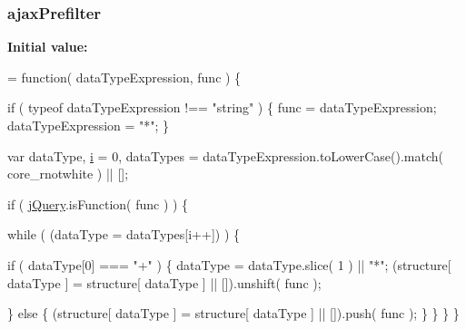 \subsubsection[{ajax\+Prefilter}]{ ajax\+Prefilter}\label{jquery-1_810_82-vsdoc_8js_a414ccda111294ca405827d1f416a7512}
{\bfseries Initial value\+:}
\begin{DoxyCode}
= \textcolor{keyword}{function}( dataTypeExpression, func ) \{



        \textcolor{keywordflow}{if} ( typeof dataTypeExpression !== \textcolor{stringliteral}{"string"} ) \{
            func = dataTypeExpression;
            dataTypeExpression = \textcolor{stringliteral}{"*"};
        \}

        var dataType,
            \hyperlink{_bibabook_2_scripts_2respond_8min_8js_a5e25b1d1bed9ab5f3174b76d6a722180}{i} = 0,
            dataTypes = dataTypeExpression.toLowerCase().match( core\_rnotwhite ) || [];

        \textcolor{keywordflow}{if} ( \hyperlink{jquery-1_810_82-vsdoc_8js_add5237586d970a38a81f990e8eb28c6c}{jQuery}.isFunction( func ) ) \{
            
            \textcolor{keywordflow}{while} ( (dataType = dataTypes[i++]) ) \{
                
                \textcolor{keywordflow}{if} ( dataType[0] === \textcolor{stringliteral}{"+"} ) \{
                    dataType = dataType.slice( 1 ) || \textcolor{stringliteral}{"*"};
                    (structure[ dataType ] = structure[ dataType ] || []).unshift( func );

                
                \} \textcolor{keywordflow}{else} \{
                    (structure[ dataType ] = structure[ dataType ] || []).push( func );
                \}
            \}
        \}
    \}
\end{DoxyCode}
\hypertarget{jquery-1_810_82-vsdoc_8js_a558f714e59e1575482b9dce5b917a905}{}
